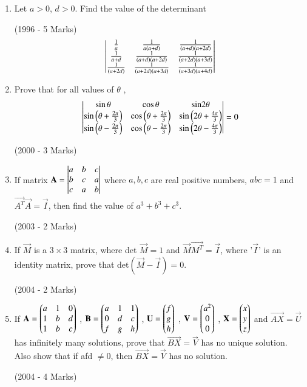 \documentclass[journal,12pt,twocolumn]{IEEEtran}
\theoremstyle{remark}
\begin{document}
\begin{enumerate}
	\item Let $a>0$, $d>0$. Find the value of the determinant

		\hfill(1996 - 5 Marks)
		$$\begin{vmatrix}
			\frac{1}{a} & \frac{1}{a(a+d)} & \frac{1}{(a+d)(a+2d)} \\
			\frac{1}{a+d} & \frac{1}{(a+d)(a+2d)} & \frac{1}{(a+2d)(a+3d)} \\
			\frac{1}{(a+2d)} & \frac{1}{(a+2d)(a+3d)} & \frac{1}{(a+3d)(a+4d)}\end{vmatrix}$$

	\item Prove that for all values of $\theta$ ,
		$$\mydet{
			\sin\theta & \cos\theta & \sin$2$\theta \\
			\sin\brak{\theta+\frac{2\pi}{3}} & \cos\brak{\theta+\frac{2\pi}{3}} & \sin\brak{2\theta+\frac{4\pi}{3}} \\
			\sin\brak{\theta-\frac{2\pi}{3}} & \cos\brak{\theta-\frac{2\pi}{3}} & \sin\brak{2\theta-\frac{4\pi}{3}}} = 0$$

		\hfill(2000 - 3 Marks)

	\item If matrix 
		$\mathbf{A} = \begin{vmatrix}
			a & b & c \\
			b & c & a \\
			c & a & b \end{vmatrix} $
		where $a,b,c$ are real positive numbers, $abc=1$ and $\vec{A^T}\vec{A}=\vec{I}$, then find the value of $a^3+b^3+c^3$.

		\hfill(2003 - 2 Marks)

	\item If $\vec{M}$ is a $3\times3$ matrix, where det $\vec{M}=1$ and $\vec{M}\vec{M^T}=\vec{I}$, where '$\vec{I}$' is an identity matrix, prove that det$(\vec{M}-\vec{I})=0$.
		
		\hfill(2004 - 2 Marks)

	\item If $\mathbf{A} = \begin{pmatrix}
			a & 1 & 0 \\
			1 & b & d \\
			1 & b & c \end{pmatrix}$ ,
		$\mathbf{B} = \begin{pmatrix}
			a & 1 & 1 \\
			0 & d & c \\
			f & g & h \end{pmatrix}$ ,
		$\mathbf{U} = \begin{pmatrix}
			f \\
			g \\
			h \end{pmatrix}$ ,
		$\mathbf{V} = \begin{pmatrix}
			a^2 \\
			0 \\
			0 \end{pmatrix}$ ,
		$\mathbf{X} = \begin{pmatrix}
			x \\
			y \\
			z \end{pmatrix}$
		and $\vec{AX}=\vec{U}$ has infinitely many solutions, prove that $\vec{BX}=\vec{V}$ has no unique solution. Also show that if afd $\neq0$, then $\vec{BX}=\vec{V}$ has no solution.

		\hfill(2004 - 4 Marks)
\end{enumerate}
\end{document}
